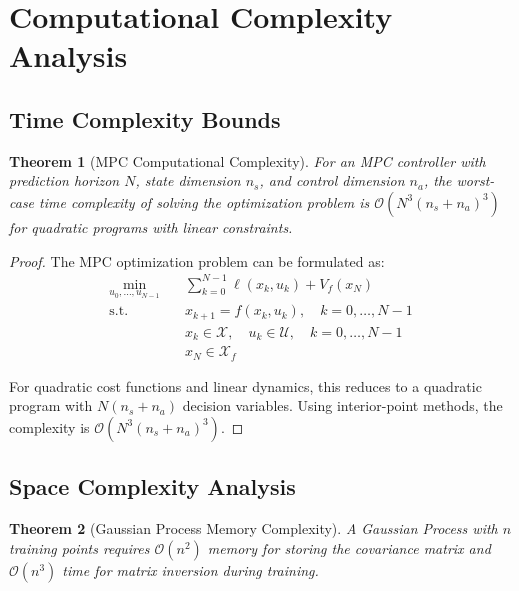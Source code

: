 \documentclass[11pt,twoside]{article}
\newtheorem{theorem}{Theorem}[section]
\begin{document}




\section{Computational Complexity Analysis}

\subsection{Time Complexity Bounds}

\begin{theorem}[MPC Computational Complexity]
For an MPC controller with prediction horizon $N$, state dimension $n_s$, and control dimension $n_a$, the worst-case time complexity of solving the optimization problem is $\mathcal{O}(N^3 (n_s + n_a)^3)$ for quadratic programs with linear constraints.
\end{theorem}

\begin{proof}
The MPC optimization problem can be formulated as:
\begin{align}
\min_{u_0, \ldots, u_{N-1}} \quad & \sum_{k=0}^{N-1} \ell(x_k, u_k) + V_f(x_N) \\
\text{s.t.} \quad & x_{k+1} = f(x_k, u_k), \quad k = 0, \ldots, N-1 \\
& x_k \in \mathcal{X}, \quad u_k \in \mathcal{U}, \quad k = 0, \ldots, N-1 \\
& x_N \in \mathcal{X}_f
\end{align}

For quadratic cost functions and linear dynamics, this reduces to a quadratic program with $N(n_s + n_a)$ decision variables. Using interior-point methods, the complexity is $\mathcal{O}(N^3 (n_s + n_a)^3)$.
\end{proof}

\subsection{Space Complexity Analysis}

\begin{theorem}[Gaussian Process Memory Complexity]
A Gaussian Process with $n$ training points requires $\mathcal{O}(n^2)$ memory for storing the covariance matrix and $\mathcal{O}(n^3)$ time for matrix inversion during training.
\end{theorem}
\end{document}
